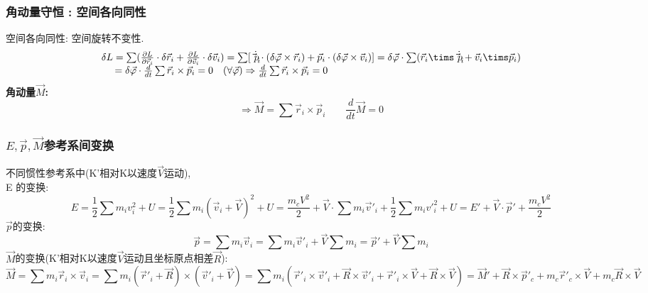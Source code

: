 \documentclass{article}
\begin{document}
\subsubsection{角动量守恒 : 空间各向同性}
空间各向同性: 空间旋转不变性.
\begin{displaymath}
\begin{array}{ll}
\delta L = \sum (\frac{\partial L}{\partial \vec r_i} \cdot \delta \vec r_i + \frac{\partial L}{\partial \vec v_i} \cdot \delta \vec v_i)
 = \sum [\dot{\vec p_i} \cdot (\delta \vec \varphi \times \vec r_i) + \vec p_i \cdot ( \delta \vec \varphi \times \vec v_i )]
 = \delta \vec \varphi \cdot \sum (\vec r_i \tims \dot{\vec p_i} + \vec v_i \tims \vec p_i) \\
 \quad\  = \delta \vec \varphi \cdot \frac{d}{dt} \sum \vec r_i \times \vec p_i
 = 0\quad(\forall \vec \varphi)
 \Rightarrow \frac{d}{dt}\sum \vec r_i \times \vec p_i = 0
\end{array}
\end{displaymath}
\textbf{角动量$\vec M$: }
\[\Rightarrow \vec M = \sum \vec r_i \times \vec p_i \qquad \frac{d}{dt}\vec M = 0\]


\subsubsection{$E,\vec p,\vec M$参考系间变换}
不同惯性参考系中(K'相对K以速度$\vec V$运动),\\
E 的变换:
\[E = \frac{1}{2} \sum m_iv_i^2 + U = \frac{1}{2} \sum m_i(\vec v_i + \vec V)^2 + U 
 = \frac{m_c V^2}{2} + \vec V \cdot \sum m_i \vec v'_i + \frac{1}{2} \sum m_i v'_i^2 + U
 = E' + \vec V \cdot \vec p' + \frac{m_c V^2}{2}\]
$\vec p$的变换:
\[\vec p = \sum m_i \vec v_i = \sum m_i \vec v'_i + \vec V \sum m_i = \vec p' + \vec V \sum m_i\]
$\vec M$的变换(K'相对K以速度$\vec V$运动且坐标原点相差$\vec R$):
\[\vec M = \sum m_i \vec r_i \times \vec v_i = \sum m_i (\vec r'_i + \vec R) \times (\vec v'_i + \vec V)
 = \sum m_i( \vec r'_i \times \vec v'_i +  \vec R \times \vec v'_i + \vec r'_i \times \vec V + \vec R \times \vec V)
 = \vec M' + \vec R \times \vec p'_c + m_c \vec r'_c \times \vec V + m_c \vec R \times \vec V\]
\end{document}
